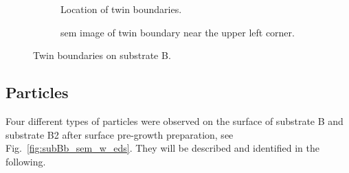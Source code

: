 \begin{figure}[htbp]
    \centering
    \begin{subfigure}[t]{0.4\linewidth}
        \centering
    \caption{Location of twin boundaries.}\label{fig:subBb_twins_illustration}
    \end{subfigure}
    \hfill
    \begin{subfigure}[t]{0.5333\linewidth}
    \centering
    \caption{\Ac{sem} image of twin boundary near the upper left corner.}\label{fig:subBb_sem_twins}
    \end{subfigure}
    \caption[Twin boundaries on substrate B.]{Twin boundaries on substrate B.}\label{fig:subBb_twin_boundaries}
\end{figure}

\subsection{Particles}

Four different types of particles were observed on the surface of substrate B and substrate B2 after surface pre-growth preparation, see Fig.~\ref{fig:subBb_sem_w_eds}. They will be described and identified in the following.

